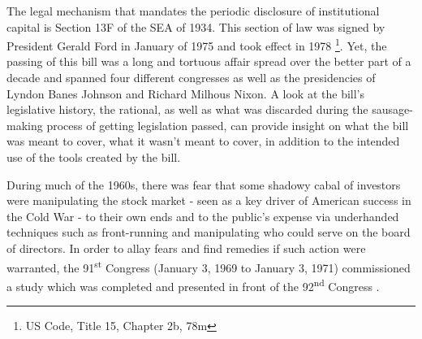 The legal mechanism that mandates the periodic disclosure of institutional capital is Section 13F of the SEA of 1934.  This section of law was signed by President Gerald Ford in January of 1975 and took effect in 1978 \footnote{US Code, Title 15, Chapter 2b, 78m}\nocite{US Code}. Yet, the passing of this bill was a long and tortuous affair spread over the better part of a decade and spanned four different congresses as well as the presidencies of Lyndon Banes Johnson and Richard Milhous Nixon. A look at the bill's legislative history, the rational, as well as what was discarded during the sausage-making process of getting legislation passed, can provide insight on what the bill was meant to cover, what it wasn't meant to cover, in addition to the intended use of the tools created by the bill.  
	
During much of the 1960s, there was fear that some shadowy cabal of investors were manipulating the stock market - seen as a key driver of American success in the Cold War - to their own ends and to the public's expense via underhanded techniques such as front-running and manipulating who could serve on the board of directors.  In order to allay fears and find remedies if such action were warranted, the 91\textsuperscript{st} Congress (January 3, 1969 to January 3, 1971) commissioned a study which was completed and presented in front of the 92\textsuperscript{nd} Congress \citep{Hearing71}.
	
